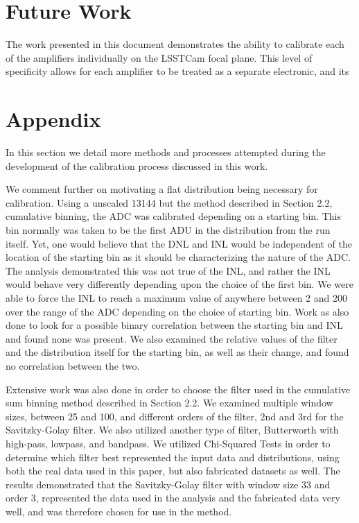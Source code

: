\documentclass[11pt, letterpaper]{article}
\begin{document}
\section{Future Work}
\indent


The work presented in this document demonstrates the ability to calibrate each of the amplifiers individually on the LSSTCam focal plane. 
This level of specificity allows for each amplifier to be treated as a separate electronic, and its 

\section{Appendix}
\indent

In this section we detail more methods and processes attempted during the development of the calibration process discussed in this work. 
\indent


We comment further on motivating a flat distribution being necessary for calibration.
Using a unscaled 13144 but the method described in Section 2.2, cumulative binning, the ADC was calibrated depending on a starting bin.
This bin normally was taken to be the first ADU in the distribution from the run itself. 
Yet, one would believe that the DNL and INL would be independent of the location of the starting bin as it should be characterizing the nature of the ADC.
The analysis demonstrated this was not true of the INL, and rather the INL would behave very differently depending upon the choice of the first bin. 
We were able to force the INL to reach a maximum value of anywhere between 2 and 200 over the range of the ADC depending on the choice of starting bin.
Work as also done to look for a possible binary correlation between the starting bin and INL and found none was present. 
We also examined the relative values of the filter and the distribution itself for the starting bin, as well as their change, and found no correlation between the two. 
 \indent 
 
Extensive work was also done in order to choose the filter used in the cumulative sum binning method described in Section 2.2. 
We examined multiple window sizes, between 25 and 100, and different orders of the filter, 2nd and 3rd for the Savitzky-Golay filter. 
We also utilized another type of filter, Butterworth with high-pass, lowpass, and bandpass. 
We utilized Chi-Squared Tests in order to determine which filter best represented the input data and distributions, using both the real data used in this paper, but also fabricated datasets as well. 
The results demonstrated that the Savitzky-Golay filter with window size 33 and order 3, represented the data used in the analysis and the fabricated data very well, and was therefore chosen for use in the method. 
 \indent 
\end{document}
